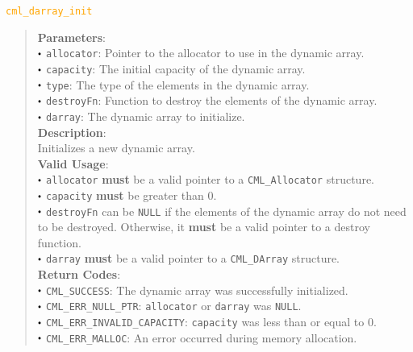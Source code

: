 \documentclass[a4paper,oneside,8pt]{extarticle}
\newcommand{\macro}[1]{
  \noindent\textcolor{orange}{\texttt{#1}}
  \vspace{-0.3em}
}
\renewcommand{\dot}{\raisebox{0.3ex}{\scalebox{0.6}{$\bullet$}}}
\theoremstyle{definition}
\begin{document}
\macro{cml\_darray\_init}
\begin{quote}
  \textbf{Parameters}: \\
  $\dot$ \texttt{allocator}: Pointer to the allocator to use in the dynamic array. \\
  $\dot$ \texttt{capacity}: The initial capacity of the dynamic array. \\
  $\dot$ \texttt{type}: The type of the elements in the dynamic array. \\
  $\dot$ \texttt{destroyFn}: Function to destroy the elements of the dynamic array. \\
  $\dot$ \texttt{darray}: The dynamic array to initialize. \\
  
  \vspace{-0.75em}
  \textbf{Description}: \\
  Initializes a new dynamic array. \\

  \vspace{-0.75em}
  \textbf{Valid Usage}: \\
  $\dot$ \texttt{allocator} \textbf{must} be a valid pointer to a \texttt{CML\_Allocator} structure. \\
  $\dot$ \texttt{capacity} \textbf{must} be greater than 0. \\
  $\dot$ \texttt{destroyFn} can be \texttt{NULL} if the elements of the dynamic array do not need to be destroyed. Otherwise, it \textbf{must} be a valid pointer to a destroy function. \\
  $\dot$ \texttt{darray} \textbf{must} be a valid pointer to a \texttt{CML\_DArray} structure. \\

  \vspace{-0.75em}
  \textbf{Return Codes}: \\
  $\dot$ \texttt{CML\_SUCCESS}: The dynamic array was successfully initialized. \\
  $\dot$ \texttt{CML\_ERR\_NULL\_PTR}: \texttt{allocator} or \texttt{darray} was \texttt{NULL}. \\
  $\dot$ \texttt{CML\_ERR\_INVALID\_CAPACITY}: \texttt{capacity} was less than or equal to 0. \\
  $\dot$ \texttt{CML\_ERR\_MALLOC}: An error occurred during memory allocation. \\
\end{quote}
\end{document}
